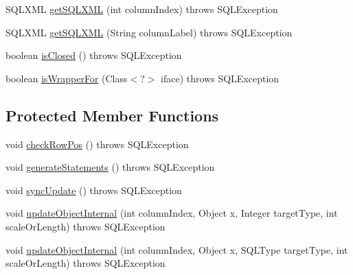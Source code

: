 \begin{DoxyCompactItemize}
\item 
S\+Q\+L\+X\+ML \mbox{\hyperlink{classcom_1_1mysql_1_1cj_1_1jdbc_1_1result_1_1_updatable_result_set_a5b0dff078f9b3fa811685939d0269981}{get\+S\+Q\+L\+X\+ML}} (int column\+Index)  throws S\+Q\+L\+Exception 
\item 
S\+Q\+L\+X\+ML \mbox{\hyperlink{classcom_1_1mysql_1_1cj_1_1jdbc_1_1result_1_1_updatable_result_set_a179c16215a0863865052680078165e1d}{get\+S\+Q\+L\+X\+ML}} (String column\+Label)  throws S\+Q\+L\+Exception 
\item 
boolean \mbox{\hyperlink{classcom_1_1mysql_1_1cj_1_1jdbc_1_1result_1_1_updatable_result_set_a9144d1720fc2d27e81adc9814fb8fd58}{is\+Closed}} ()  throws S\+Q\+L\+Exception 
\item 
boolean \mbox{\hyperlink{classcom_1_1mysql_1_1cj_1_1jdbc_1_1result_1_1_updatable_result_set_a4bed9bac57f0f818208306c94f5eaedd}{is\+Wrapper\+For}} (Class$<$?$>$ iface)  throws S\+Q\+L\+Exception 
\end{DoxyCompactItemize}
\subsection*{Protected Member Functions}
\begin{DoxyCompactItemize}
\item 
void \mbox{\hyperlink{classcom_1_1mysql_1_1cj_1_1jdbc_1_1result_1_1_updatable_result_set_a6dd13b06ca291576ff709fb62451637a}{check\+Row\+Pos}} ()  throws S\+Q\+L\+Exception 
\item 
void \mbox{\hyperlink{classcom_1_1mysql_1_1cj_1_1jdbc_1_1result_1_1_updatable_result_set_ab31166ae9f37bf7b23648d7565f345d1}{generate\+Statements}} ()  throws S\+Q\+L\+Exception 
\item 
void \mbox{\hyperlink{classcom_1_1mysql_1_1cj_1_1jdbc_1_1result_1_1_updatable_result_set_aa98341ec11939c41a5cd519d23fb055e}{sync\+Update}} ()  throws S\+Q\+L\+Exception 
\item 
void \mbox{\hyperlink{classcom_1_1mysql_1_1cj_1_1jdbc_1_1result_1_1_updatable_result_set_a65af746cb788d9ddadcf675f0b96023b}{update\+Object\+Internal}} (int column\+Index, Object x, Integer target\+Type, int scale\+Or\+Length)  throws S\+Q\+L\+Exception 
\item 
void \mbox{\hyperlink{classcom_1_1mysql_1_1cj_1_1jdbc_1_1result_1_1_updatable_result_set_a9cfc113a3778b67ce042e97c205c4b98}{update\+Object\+Internal}} (int column\+Index, Object x, S\+Q\+L\+Type target\+Type, int scale\+Or\+Length)  throws S\+Q\+L\+Exception 
\end{DoxyCompactItemize}
